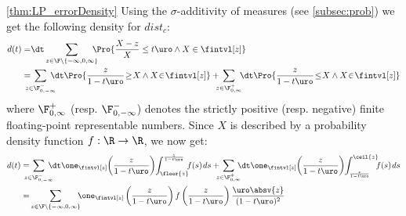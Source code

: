 \begin{myproof}{\cref{thm:LP_errorDensity}}
Using the $\sigma$-additivity of measures (see \cref{subsec:prob}) we get the following density for $dist_c$:
\newcommand{\ssin}{\hspace{-2pt}\in\hspace{-2pt}}
\begin{align*}
d(t)=&\dt\sum_{z\in\F\setminus\{-\infty,0,\infty\}}\hspace{-8pt}\Pro{\frac{X-z}{X}\leq t\uro\wedge X\in \fintvl[z]}\\
=&\hspace{-8pt} \sum_{z\in\F^-_{0,-\infty}}\hspace{-8pt}\dt\Pro{\frac{z}{1-t\uro}\hspace{-2pt}\geq\hspace{-2pt} X\wedge X\ssin\fintvl[z]}+\hspace{-6pt}
\sum_{z\in\F^+_{0,\infty}}\hspace{-4pt}\dt\Pro{\frac{z}{1-t\uro}\hspace{-2pt}\leq\hspace{-2pt} X \wedge X\ssin \fintvl[z]}
\end{align*}
where $\F^+_{0,\infty}$ (resp. $\F^-_{0,-\infty}$) denotes the strictly positive (resp. negative) finite floating-point representable numbers.
Since $X$ is described by a probability density function $f:\R\to\R$, we now get:
\begin{align}
d(t)
=&\hspace{-8pt}\sum_{z\in\F^-_{0,-\infty}}\hspace{-8pt}\dt\one_{\fintvl[z]}\hspace{-2pt} \left(\frac{z}{1-t\uro}\right)\hspace{-2pt} \int^{\frac{z}{1-t\uro}}_{\floor{z}}\hspace{-4pt}f(s)\hspace{1pt}ds\nonumber+
\hspace{-6pt}\sum_{z\in\F^+_{0,\infty}}\hspace{-6pt} \dt\one_{\fintvl[z]}\hspace{-2pt}\left(\frac{z}{1-t\uro}\right)\hspace{-2pt} \int^{\ceil{z}}_{\frac{z}{1-t\uro}}\hspace{-5pt} f(s)\hspace{1pt}ds\nonumber 
\\
=&\sum_{z\in\F\setminus\{-\infty,0,\infty\}}\hspace{-5pt}\one_{\fintvl[z]}\left(\frac{z}{1-t\uro}\right) f\left(\frac{z}{1-t\uro}\right) \frac{\uro\absv{z}}{(1-t\uro)^2}\nonumber
\end{align}
\end{myproof}

